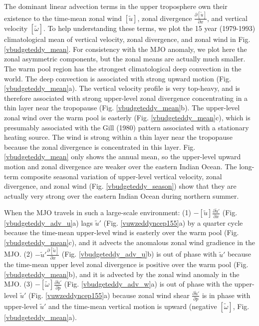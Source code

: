 \documentclass[12pt]{article}
\begin{document}
The dominant linear advection terms in the upper troposphere 
own their existence to the time-mean
zonal wind $[\widetilde{u}]$, 
zonal divergence $\frac{\partial [\widetilde{u}]}{\partial x}$,
and vertical velocity $[\widetilde{\omega}]$.
To help understanding these terms, 
we plot the 15 year (1979-1993) climatological mean of vertical velocity,
zonal divergence, and zonal wind 
in Fig. \ref{vbudgeteddy_mean}.
For consistency with the MJO anomaly, we plot here the zonal asymmetric
components, but the zonal means are actually much smaller.
The warm pool region has the strongest climatological deep convection 
in the world. The deep convection is associated with strong upward motion
(Fig. \ref{vbudgeteddy_mean}a). The vertical velocity profile is very top-heavy,
and is therefore associated with strong upper-level zonal divergence
concentrating in a thin layer near the tropopause 
(Fig. \ref{vbudgeteddy_mean}b).
The upper-level zonal wind over the warm pool is easterly
(Fig. \ref{vbudgeteddy_mean}c), which is presumably associated with the Gill
(1980) pattern associated with a stationary heating source.
The wind is strong within a thin layer near the tropopause because the
zonal divergence is concentrated in this layer.
Fig. \ref{vbudgeteddy_mean} only shows the annual mean, so the upper-level
upward motion and zonal divergence are weaker over the eastern Indian Ocean.
The long-term composite seasonal variation of upper-level vertical velocity,
zonal divergence, and zonal wind (Fig. \ref{vbudgeteddy_season}) show
that they are actually very strong over the eastern Indian Ocean during
northern summer.

When the MJO travels in
such a large-scale environment: 
(1) $- [\widetilde{u}] \frac{\partial \widetilde{u} '}{\partial x}$
(Fig. \ref{vbudgeteddy_adv_u}a) lags $\widetilde{u}'$ 
(Fig. \ref{vuwzeddyncep155}a) by a
quarter cycle because the time-mean upper-level wind is easterly over
the warm pool (Fig. \ref{vbudgeteddy_mean}c), and it advects the anomalous zonal
wind gradience in the MJO.
(2) $- \widetilde{u} ' \frac{\partial [\widetilde{u}]}{\partial x}$
(Fig. \ref{vbudgeteddy_adv_u}b) is out of phase
with $\widetilde{u}'$ because the time-mean upper level zonal divergence 
is positive over the
warm pool (Fig. \ref{vbudgeteddy_mean}b), and it is advected by the zonal
wind anomaly in the MJO.
(3) $- [\widetilde{\omega}] \frac{\partial \widetilde{u} '}{\partial p}$
(Fig. \ref{vbudgeteddy_adv_w}a)
is out of
phase with the upper-level $\widetilde{u}'$ 
(Fig. \ref{vuwzeddyncep155}a) because zonal
wind shear $\frac{\partial \widetilde{u}'}{\partial p}$ is in phase with
upper-level $\widetilde{u}'$ and the time-mean vertical motion is
upward (negative
$[\widetilde{\omega}]$, Fig. \ref{vbudgeteddy_mean}a).
\end{document}
